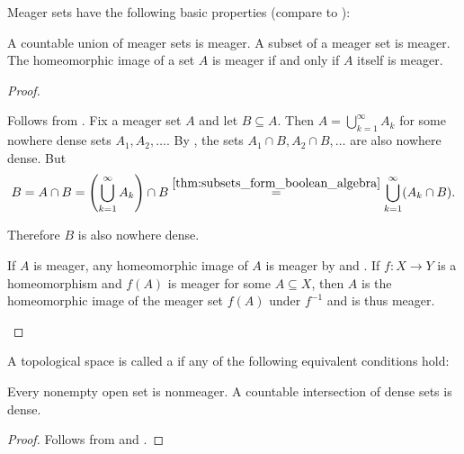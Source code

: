 \begin{proposition}\label{thm:meager_set_properties}\cite[43]{Rudin1991}
  Meager sets have the following basic properties (compare to ):
  \begin{propenum}
     A countable union of meager sets is meager.
     A subset of a meager set is meager.
     The homeomorphic image of a set \( A \) is meager if and only if \( A \) itself is meager.
  \end{propenum}
\end{proposition}
\begin{proof}\mbox{}
  \begin{description}
     Follows from .
     Fix a meager set \( A \) and let \( B \subseteq A \). Then \( A = \bigcup_{k=1}^\infty A_k \) for some nowhere dense sets \( A_1, A_2, \ldots \). By , the sets \( A_1 \cap B, A_2 \cap B, \ldots \) are also nowhere dense. But
    \begin{equation*}
      B
      =
      A \cap B
      =
      \left(\bigcup_{k=1}^\infty A_k \right) \cap B
      \overset {\ref{thm:subsets_form_boolean_algebra}} =
      \bigcup_{k=1}^\infty (A_k \cap B).
    \end{equation*}

    Therefore \( B \) is also nowhere dense.

    \mbox{}
    \begin{description}
      \ImpliedBy If \( A \) is meager, any homeomorphic image of \( A \) is meager by  and .
      \Implies If \( f: X \to Y \) is a homeomorphism and \( f(A) \) is meager for some \( A \subseteq X \), then \( A \) is the homeomorphic image of the meager set \( f(A) \) under \( f^{-1} \) and is thus meager.
    \end{description}
  \end{description}
\end{proof}

\begin{definition}\label{def:baire_space}
  A topological space is called a  if any of the following equivalent conditions hold:
  \begin{defenum}
     Every nonempty open set is nonmeager.
     A countable intersection of dense sets is dense.
  \end{defenum}
\end{definition}
\begin{proof}
   Follows from  and .
\end{proof}

